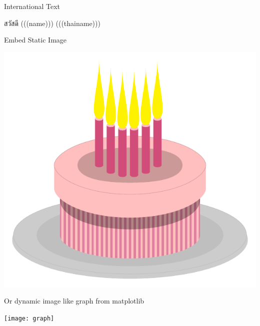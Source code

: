 \documentclass[12pt]{article}
\begin{document}
International Text

สวัสดี (((name))) (((thainame)))

Embed Static Image

\begin{center}
\includegraphics[width=0.7\linewidth]{assets/birthday-cake}
\end{center}

Or dynamic image like graph from matplotlib
\begin{center}
	\texttt{[image: graph]}
\end{center}
\end{document}
